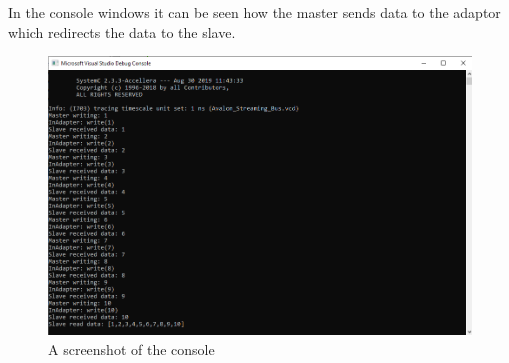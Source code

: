 In the console windows it can be seen how the master sends data to the adaptor which redirects the data to the slave.

\begin{figure}[H]
	\centering
	\includegraphics[width=\textwidth]{Images/ConsoleWindow3_5.png}
	\caption{A screenshot of the console}
	\label{fig:ConsoleWindow}
\end{figure}

 